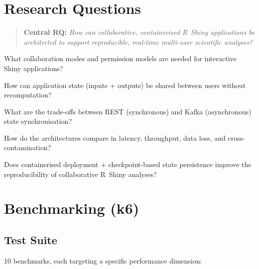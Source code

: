\documentclass[12pt,a4paper]{article}
\begin{document}
\section{Research Questions}

\begin{quote}
\textbf{Central RQ:} \textit{How can collaborative, containerised R~Shiny
applications be architected to support reproducible, real-time multi-user
scientific analyses?}
\end{quote}

\begin{description}[style=nextline, nosep]
  \item[RQ1] What collaboration modes and permission models are needed for
             interactive Shiny applications?
  \item[RQ2] How can application state (inputs + outputs) be shared between
             users without recomputation?
  \item[RQ3] What are the trade-offs between REST (synchronous) and Kafka
             (asynchronous) state synchronisation?
  \item[RQ4] How do the architectures compare in latency, throughput, data loss,
             and cross-contamination?
  \item[RQ5] Does containerised deployment + checkpoint-based state persistence
             improve the reproducibility of collaborative R~Shiny analyses?
\end{description}

\section{Benchmarking (k6)}

\subsection{Test Suite}

10 benchmarks, each targeting a specific performance dimension:
\end{document}

